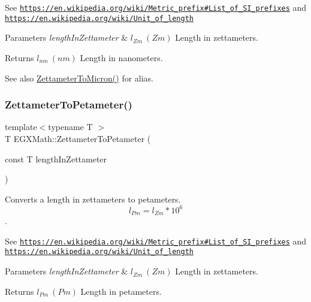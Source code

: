 See \href{https://en.wikipedia.org/wiki/Metric_prefix#List_of_SI_prefixes}{\tt https\+://en.\+wikipedia.\+org/wiki/\+Metric\+\_\+prefix\#\+List\+\_\+of\+\_\+\+S\+I\+\_\+prefixes} and \href{https://en.wikipedia.org/wiki/Unit_of_length}{\tt https\+://en.\+wikipedia.\+org/wiki/\+Unit\+\_\+of\+\_\+length} 
\begin{DoxyParams}{Parameters}
{\em length\+In\+Zettameter} & $ l_{Zm}\ (Zm)$ Length in zettameters. \\
\hline
\end{DoxyParams}
\begin{DoxyReturn}{Returns}
$ l_{nm}\ (nm)$ Length in nanometers. 
\end{DoxyReturn}
\begin{DoxySeeAlso}{See also}
\mbox{\hyperlink{group___e_g_x_math-_conversions-_length_conversions-_zettameter-_non-_s_i_gafede369c63111d97f92238e626cdfa87}{Zettameter\+To\+Micron()}} for alias. 
\end{DoxySeeAlso}
\mbox{\label{group___e_g_x_math-_conversions-_length_conversions-_zettameter-_s_i_ga85af5c37065cd355ac23b12a4f7b16f5}} 
\subsubsection{\texorpdfstring{Zettameter\+To\+Petameter()}{ZettameterToPetameter()}}
{\footnotesize\ttfamily template$<$typename T $>$ \\
T E\+G\+X\+Math\+::\+Zettameter\+To\+Petameter (\begin{DoxyParamCaption}\item[{const T}]{length\+In\+Zettameter }\end{DoxyParamCaption})}



Converts a length in zettameters to petameters. \[ l_{Pm}=l_{Zm} * 10^{6} \]. 

See \href{https://en.wikipedia.org/wiki/Metric_prefix#List_of_SI_prefixes}{\tt https\+://en.\+wikipedia.\+org/wiki/\+Metric\+\_\+prefix\#\+List\+\_\+of\+\_\+\+S\+I\+\_\+prefixes} and \href{https://en.wikipedia.org/wiki/Unit_of_length}{\tt https\+://en.\+wikipedia.\+org/wiki/\+Unit\+\_\+of\+\_\+length} 
\begin{DoxyParams}{Parameters}
{\em length\+In\+Zettameter} & $ l_{Zm}\ (Zm)$ Length in zettameters. \\
\hline
\end{DoxyParams}
\begin{DoxyReturn}{Returns}
$ l_{Pm}\ (Pm)$ Length in petameters. 
\end{DoxyReturn}
\mbox{\label{group___e_g_x_math-_conversions-_length_conversions-_zettameter-_s_i_gae7835234c6727bbfd1e9ad40c54a4740}} 
